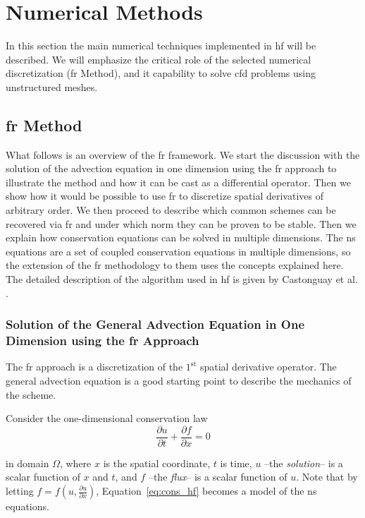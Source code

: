 
\section{Numerical Methods}
\label{sec:numerics}

In this section the main numerical techniques implemented in \gls{hf} will be described. We will emphasize the critical role of the selected numerical discretization (\gls{fr} Method), and it capability to solve \gls{cfd} problems using unstructured meshes. 

\subsection{\gls{fr} Method}
\label{sec:frmethod}

What follows is an overview of the \gls{fr} framework. We start the discussion with the solution of the advection equation in one dimension using the \gls{fr} approach to illustrate the method and how it can be cast as a differential operator. Then we show how it would be possible to use \gls{fr} to discretize spatial derivatives of arbitrary order. We then proceed to describe which common schemes can be recovered via \gls{fr} and under which norm they can be proven to be stable. Then we explain how conservation equations can be solved in multiple dimensions. The \gls{ns} equations are a set of coupled conservation equations in multiple dimensions, so the extension of the \gls{fr} methodology to them uses the concepts explained here. The detailed description of the algorithm used in \gls{hf} is given by Castonguay et al. \cite{castonguay2011}.

\subsubsection{Solution of the General Advection Equation in One Dimension using the \gls{fr} Approach}

The \gls{fr} approach is a discretization of the $1^{\mathrm{st}}$ spatial derivative operator. The general advection equation is a good starting point to describe the mechanics of the scheme.

Consider the one-dimensional conservation law
\begin{equation}
\label{eq:cons_hf}
\frac{\partial u}{\partial t} + \frac{\partial f}{\partial x} = 0
\end{equation}

in domain $\Omega$, where $x$ is the spatial coordinate, $t$ is time, $u$ --the \emph{solution}-- is a scalar function of $x$ and $t$, and $f$ --the \emph{flux}-- is a scalar function of $u$. Note that by letting $f = f(u,\frac{\partial u}{\partial x})$, Equation~\ref{eq:cons_hf} becomes a model of the \gls{ns} equations.


